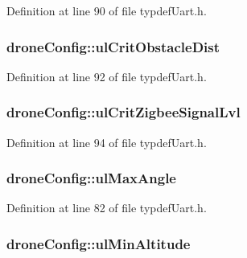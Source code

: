 Definition at line 90 of file typdef\-Uart.\-h.

\hypertarget{structdroneConfig_a39b4ebfe2fad46f568b7a2953fc8f46d}{
\subsubsection[{ul\-Crit\-Obstacle\-Dist}]{ drone\-Config\-::ul\-Crit\-Obstacle\-Dist}}\label{structdroneConfig_a39b4ebfe2fad46f568b7a2953fc8f46d}


Definition at line 92 of file typdef\-Uart.\-h.

\hypertarget{structdroneConfig_ace08c1c7161f782950192970d7a19d75}{
\subsubsection[{ul\-Crit\-Zigbee\-Signal\-Lvl}]{ drone\-Config\-::ul\-Crit\-Zigbee\-Signal\-Lvl}}\label{structdroneConfig_ace08c1c7161f782950192970d7a19d75}


Definition at line 94 of file typdef\-Uart.\-h.

\hypertarget{structdroneConfig_a0f6ba8c7c50c247ef54fa48e0f7ef729}{
\subsubsection[{ul\-Max\-Angle}]{ drone\-Config\-::ul\-Max\-Angle}}\label{structdroneConfig_a0f6ba8c7c50c247ef54fa48e0f7ef729}


Definition at line 82 of file typdef\-Uart.\-h.

\hypertarget{structdroneConfig_a93de26859c52f79b9801cf74e1e37add}{
\subsubsection[{ul\-Min\-Altitude}]{ drone\-Config\-::ul\-Min\-Altitude}}\label{structdroneConfig_a93de26859c52f79b9801cf74e1e37add}



